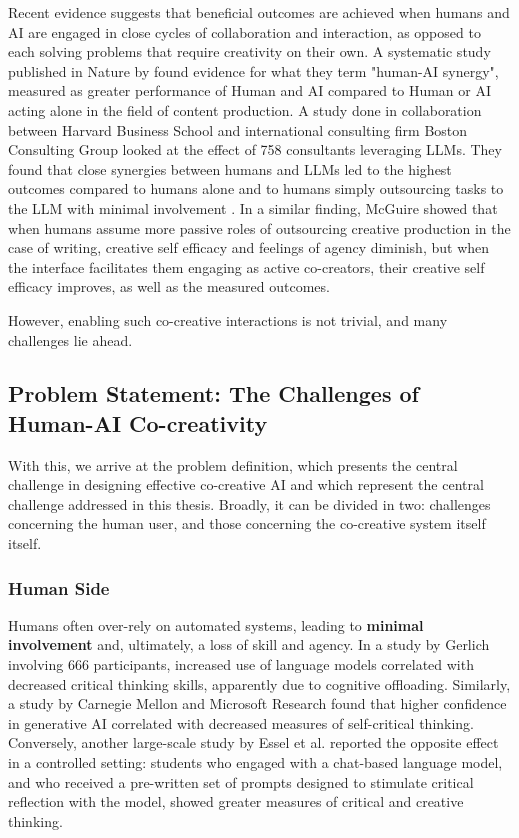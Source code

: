 Recent evidence suggests that beneficial outcomes are achieved when humans and AI are engaged in close cycles of collaboration and interaction, as opposed to each solving problems that require creativity on their own. A systematic study published in Nature by \cite{Vaccaro2024-ne} found evidence for what they term "human-AI synergy", measured as greater performance of Human and AI compared to Human or AI acting alone in the field of content production. A study done in collaboration between Harvard Business School and international consulting firm Boston Consulting Group looked at the effect of 758 consultants leveraging LLMs. They found that close synergies between humans and LLMs led to the highest outcomes compared to humans alone and to humans simply outsourcing tasks to the LLM with minimal involvement \cite{DellAcqua2023-og}. In a similar finding, McGuire \cite{McGuire2024-im} showed that when humans assume more passive roles of outsourcing creative production in  the case of writing, creative self efficacy and feelings of agency diminish, but when the interface facilitates them engaging as active co-creators, their creative self efficacy improves, as well as the measured outcomes. 

However, enabling such co-creative interactions is not trivial, and many challenges lie ahead. 

\subsection{Problem Statement: The Challenges of Human-AI Co-creativity}

With this, we arrive at the problem definition, which presents the central challenge in designing effective co-creative AI and which represent the central challenge addressed in this thesis. Broadly, it can be divided in two: challenges concerning the human user, and those concerning the co-creative system itself itself.

\subsubsection{Human Side}

Humans often over-rely on automated systems, leading to \textbf{minimal involvement} and, ultimately, a loss of skill and agency. In a study by Gerlich \cite{Gerlich2025-as} involving 666 participants, increased use of language models correlated with decreased critical thinking skills, apparently due to cognitive offloading. Similarly, a study by Carnegie Mellon and Microsoft Research found \cite{Lee2025-dw} that higher confidence in generative AI correlated with decreased measures of self-critical thinking. Conversely, another large-scale study by Essel et al. \cite{Essel2024-qc} reported the opposite effect in a controlled setting: students who engaged with a chat-based language model, and who received a pre-written set of prompts designed to stimulate critical reflection with the model, showed greater measures of critical and creative thinking.

